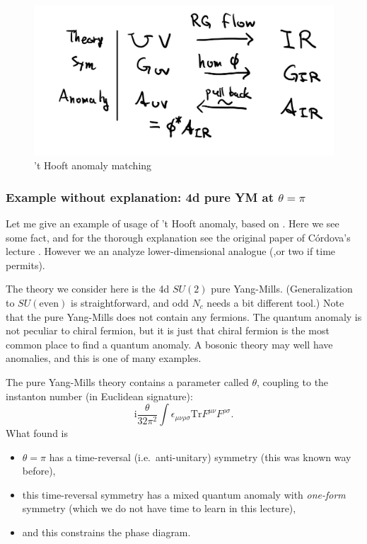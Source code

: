 \documentclass[
]{scrartcl}
\providecommand{\tightlist}{%
  \setlength{\itemsep}{0pt}\setlength{\parskip}{0pt}}
\numberwithin{equation}{section}
\theoremstyle{definition}
\theoremstyle{definition}
\theoremstyle{definition}
\theoremstyle{definition}
\theoremstyle{remark}
\begin{document}
\begin{figure}

{\centering \includegraphics[width=0.5\linewidth]{figs/flow_symmetry} 

}

\caption{'t Hooft anomaly matching}\label{fig:flow}
\end{figure}

\hypertarget{example-without-explanation-4d-pure-ym-at-theta-pi}{%
\subsubsection{\texorpdfstring{Example without explanation: 4d pure YM at \(\theta =\pi\)}{Example without explanation: 4d pure YM at \textbackslash theta =\textbackslash pi}}\label{example-without-explanation-4d-pure-ym-at-theta-pi}}

Let me give an example of usage of 't Hooft anomaly, based on \textcite{Gaiotto:2017yup}.
Here we see some fact, and for the thorough explanation see the original paper of Córdova's lecture \textcite{cordova_2020}. However we an analyze lower-dimensional analogue (,or two if time permits).

The theory we consider here is the 4d \(SU(2)\) pure Yang-Mills. (Generalization to \(SU(\text{even})\) is straightforward, and odd \(N_c\) needs a bit different tool.)
Note that the pure Yang-Mills does not contain any fermions.
The quantum anomaly is not peculiar to chiral fermion, but it is just that chiral fermion is the most common place to find a quantum anomaly.
A bosonic theory may well have anomalies, and this is one of many examples.

The pure Yang-Mills theory contains a parameter called \(\theta\), coupling to the instanton number (in Euclidean signature):
\begin{equation}
  \label{eq:thetaSU2}
  \mathrm{i}\frac{\theta}{32\pi^2}\int \epsilon_{\mu\nu\rho\sigma}\mathrm{Tr}F^{\mu\nu}F^{\rho\sigma}.
\end{equation}
What \textcite{Gaiotto:2017yup} found is

\begin{itemize}
\tightlist
\item
  \(\theta = \pi\) has a time-reversal (i.e.~anti-unitary) symmetry (this was known way before),
\item
  this time-reversal symmetry has a mixed quantum anomaly with \emph{one-form} symmetry (which we do not have time to learn in this lecture),
\item
  and this constrains the phase diagram.
\end{itemize}
\end{document}
